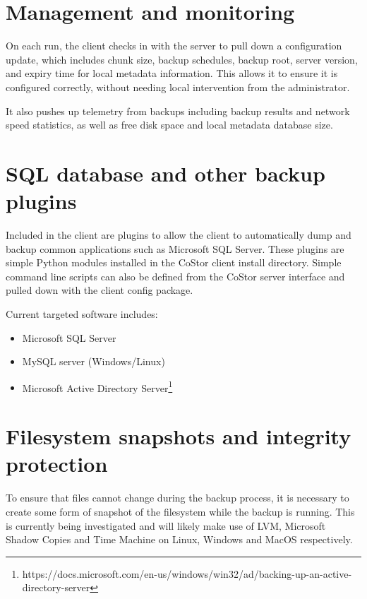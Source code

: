 \documentclass[bsc,frontabs,twoside,singlespacing,parskip,deptreport]{infthesis}     %
\begin{document}
\section{Management and monitoring}


On each run, the client checks in with the server to pull down a configuration update, which 
includes chunk size, backup schedules, backup root, server version, and expiry time for local
metadata information. This allows it to ensure it is configured correctly, without needing local 
intervention from the administrator.

It also pushes up telemetry from backups including backup results and network speed statistics, 
as well as free disk space and local metadata database size.

\section{SQL database and other backup plugins}


Included in the client are plugins to allow the client to automatically dump and backup common
applications such as Microsoft SQL Server. These plugins are simple Python modules installed in
the CoStor client install directory. Simple command line scripts can also be defined from the
CoStor server interface and pulled down with the client config package.

Current targeted software includes:

\begin{itemize}
	\item Microsoft SQL Server
	\item MySQL server (Windows/Linux)
	\item Microsoft Active Directory Server\footnote{https://docs.microsoft.com/en-us/windows/win32/ad/backing-up-an-active-directory-server}
\end{itemize}

\section{Filesystem snapshots and integrity protection}


To ensure that files cannot change during the backup process, it is necessary to create some form
of snapshot of the filesystem while the backup is running. This is currently being investigated
and will likely make use of LVM, Microsoft Shadow Copies and Time Machine on Linux, Windows and
MacOS respectively.
\end{document}
